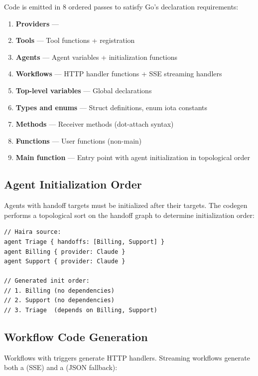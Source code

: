 Code is emitted in 8 ordered passes to satisfy Go's declaration requirements:

\begin{enumerate}
    \item \textbf{Providers} --- 
    \item \textbf{Tools} --- Tool functions + registration
    \item \textbf{Agents} --- Agent variables + initialization functions
    \item \textbf{Workflows} --- HTTP handler functions + SSE streaming handlers
    \item \textbf{Top-level variables} --- Global  declarations
    \item \textbf{Types and enums} --- Struct definitions, enum iota constants
    \item \textbf{Methods} --- Receiver methods (dot-attach syntax)
    \item \textbf{Functions} --- User functions (non-main)
    \item \textbf{Main function} --- Entry point with agent initialization in topological order
\end{enumerate}

\subsection{Agent Initialization Order}

Agents with handoff targets must be initialized after their targets. The codegen performs a topological sort on the handoff graph to determine initialization order:

\begin{lstlisting}
// Haira source:
agent Triage { handoffs: [Billing, Support] }
agent Billing { provider: Claude }
agent Support { provider: Claude }

// Generated init order:
// 1. Billing (no dependencies)
// 2. Support (no dependencies)
// 3. Triage  (depends on Billing, Support)
\end{lstlisting}

\subsection{Workflow Code Generation}

Workflows with triggers generate HTTP handlers. Streaming workflows generate both a  (SSE) and a  (JSON fallback):

